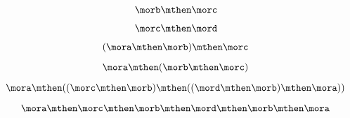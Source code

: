 {\begin{forslides}
        \begin{equation}
            \label{eq:09}
            \morb \mthen \morc
        \end{equation}

        \begin{equation}
            \label{eq:10}
            \morc \mthen \mord
        \end{equation}

        \begin{equation}
            \label{eq:11}
            (\mora \mthen \morb) \mthen \morc
        \end{equation}

        \begin{equation}
            \label{eq:12}
            \mora \mthen  (\morb \mthen \morc )
        \end{equation}

        \begin{equation}
            \label{eq:13}
            \mora \mthen  ((\morc \mthen \morb ) \mthen (( \mord \mthen \morb ) \mthen \mora ))
        \end{equation}

        \begin{equation}
            \label{eq:14}
            \mora \mthen  \morc \mthen \morb  \mthen \mord \mthen \morb  \mthen \mora
        \end{equation}



\end{forslides}}
